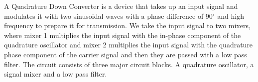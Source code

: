 A Quadrature Down Converter is a device that takes up an input signal and modulates it with two sinusoidal waves with a phase difference of 90$^\circ$ and high frequency to prepare it for transmission. We take the input signal to two mixers, where mixer 1 multiplies the input signal with the in-phase component of the quadrature oscillator and mixer 2 multiplies the input signal with the quadrature phase component of the carrier signal and then they are passed with a low pass filter. The circuit consists of three major circuit blocks. A quadrature oscillator, a signal mixer and a low pass filter.